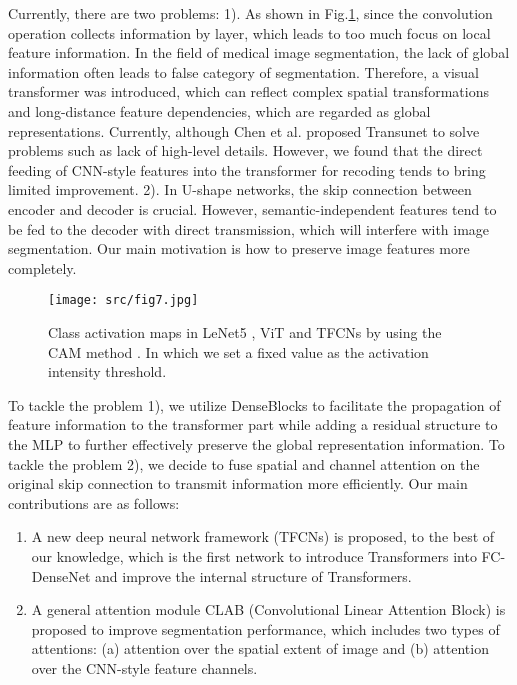 \documentclass[runningheads]{llncs}
\begin{document}
Currently, there are two problems: 1). As shown in Fig.\ref{fig1}, since the convolution operation collects information by layer, which leads to too much focus on local feature information. In the field of medical image segmentation, the lack of global information often leads to false category of segmentation. Therefore, a visual transformer was introduced, which can reflect complex spatial transformations and long-distance feature dependencies, which are regarded as global representations. Currently, although Chen et al. proposed Transunet \cite{chen2021transunet} to solve problems such as lack of high-level details. However, we found that the direct feeding of CNN-style features into the transformer for recoding tends to bring limited improvement. 2). In U-shape networks, the skip connection between encoder and decoder is crucial. However, semantic-independent features tend to be fed to the decoder with direct transmission, which will interfere with image segmentation. Our main motivation is how to preserve image features more completely.
\vspace{-10pt}
\begin{figure}[H]
\centerline{\texttt{[image: src/fig7.jpg]}}
\vspace{-10pt}
\caption{Class activation maps in LeNet5 \cite{lecun1998gradient}, ViT \cite{dosovitskiy2020image} and TFCNs by using the CAM method \cite{zhou2016learning}. In which we set a fixed value as the activation intensity threshold.}
\label{fig1}
\end{figure}
\vspace{-20pt}
To tackle the problem 1), we utilize DenseBlocks to facilitate the propagation of feature information to the transformer part while adding a residual structure to the MLP to further effectively preserve the global representation information. To tackle the problem 2), we decide to fuse spatial and channel attention on the original skip connection to transmit information more efficiently. Our main contributions are as follows:
\begin{enumerate}
\item A new deep neural network framework (TFCNs) is proposed, to the best of our knowledge, which is the first network to introduce Transformers into FC-DenseNet and improve the internal structure of Transformers.
\item A general attention module CLAB (Convolutional Linear Attention Block) is proposed to improve segmentation performance, which includes two types of attentions: (a) attention over the spatial extent of image and (b) attention over the CNN-style feature channels.
\end{enumerate}
\end{document}
